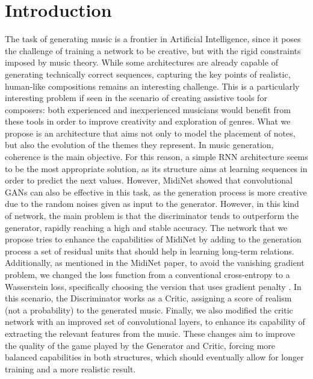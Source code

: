 
\section{Introduction}
\label{sec:introduction}
The task of generating music is a frontier in Artificial Intelligence, since it poses the challenge of training a network to be creative, but with the rigid constraints imposed by music theory. 
While some architectures are already capable of generating technically correct sequences, capturing the key points of realistic, human-like compositions remains an interesting challenge. 
This is a particularly interesting problem if seen in the scenario of creating assistive tools for composers: both experienced and inexperienced musicians would benefit from these tools in order to improve creativity and exploration of genres.
What we propose is an architecture that aims not only to model the placement of notes, but also the evolution of the themes they represent. 
In music generation, coherence is the main objective. 
For this reason, a simple RNN architecture seems to be the most appropriate solution, as its structure aims at learning sequences in order to predict the next values. 
However, MidiNet \cite{Yang-2017} showed that convolutional GANs can also be effective in this task, as the generation process is more creative due to the random noises given as input to the generator. 
However, in this kind of network, the main problem is that the discriminator tends to outperform the generator, rapidly reaching a high and stable accuracy.
The network that we propose tries to enhance the capabilities of MidiNet by adding to the generation process a set of residual units that should help in learning long-term relations. 
Additionally, as mentioned in the MidiNet paper, to avoid the vanishing gradient problem, we changed the loss function from a conventional cross-entropy to a Wasserstein loss, specifically choosing the version that uses gradient penalty \cite{Gulrajani-2017, Arjovsky-2017}. 
In this scenario, the Discriminator works as a Critic, assigning a score of realism (not a probability) to the generated music. 
Finally, we also modified the critic network with an improved set of convolutional layers, to enhance its capability of extracting the relevant features from the music. 
These changes aim to improve the quality of the game played by the Generator and Critic, forcing more balanced capabilities in both structures, which should eventually allow for longer training and a more realistic result.


